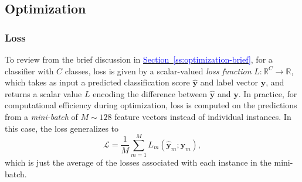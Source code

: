 \documentclass[11pt, a4paper]{article}
\newcommand{\myhref}[2]{\hyperref[#1]{\textcolor{blue}{#2}}}
\renewcommand{\vec}[1]{\bm{#1}}
\newcommand{\y}{\vec{y}}
\begin{document}
\subsection{Optimization} \label{ss:optimization}
\subsubsection{Loss} \label{sss:loss}
To review from the brief discussion in \myhref{ss:optimization-brief}{Section~\ref{ss:optimization-brief}}, for a classifier with $ C $ classes, loss is given by a scalar-valued \textit{loss function} $ L : \mathbb{R}^{C} \to \mathbb{R} $, which takes as input a predicted classification score $ \hat{\y} $ and label vector $ \y $, and returns a scalar value $ L $ encoding the difference between $ \hat{\y} $ and $ \y $.
In practice, for computational efficiency during optimization, loss is computed on the predictions from a \textit{mini-batch} of $ M \sim 128 $ feature vectors instead of individual instances.
In this case, the loss generalizes to
\begin{equation}
    \mathcal{L} = \frac{1}{M} \sum_{m = 1}^{M} L_{m} (\hat{\y}_{m}; \y_{m}), \label{eq:loss-batch}
\end{equation}
which is just the average of the losses associated with each instance in the mini-batch.
\end{document}
